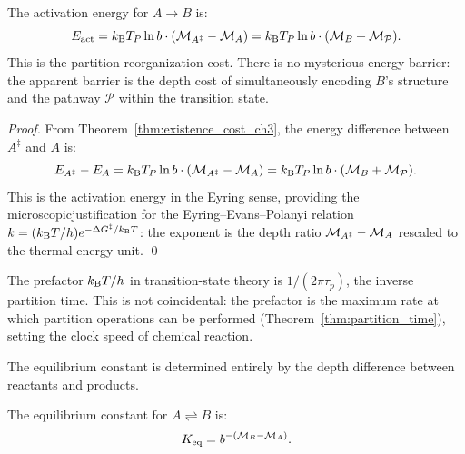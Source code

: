 \begin{corollary}
\label{cor:activation_energy}
The activation energy for $A \to B$ is:
\begin{equation}
  E_{\mathrm{act}} = k_{\mathrm{B}} T_P \ln b \cdot (\mathcal{M}_{A^\ddagger} - \mathcal{M}_A)
                   = k_{\mathrm{B}} T_P \ln b \cdot (\mathcal{M}_B + \mathcal{M}_{\mathcal{P}}).
  \label{eq:activation_energy}
\end{equation}
This is the partition reorganization cost. There is no mysterious energy
barrier: the apparent barrier is the depth cost of simultaneously encoding
$B$'s structure and the pathway $\mathcal{P}$ within the transition state.
\end{corollary}

\begin{proof}
From Theorem~\ref{thm:existence_cost_ch3}, the energy difference between
$A^\ddagger$ and $A$ is:
\begin{equation}
  E_{A^\ddagger} - E_A = k_{\mathrm{B}} T_P \ln b \cdot (\mathcal{M}_{A^\ddagger} - \mathcal{M}_A)
                       = k_{\mathrm{B}} T_P \ln b \cdot (\mathcal{M}_B + \mathcal{M}_{\mathcal{P}}).
\end{equation}
This is the activation energy in the Eyring sense, providing the microscopicjustification for the Eyring--Evans--Polanyi relation $k = ({k_{\mathrm{B}} T}/{h}) e^{-\Delta G^\ddagger/k_{\mathrm{B}} T}$:
the exponent is the depth ratio $\mathcal{M}_{A^\ddagger} - \mathcal{M}_A$ rescaled to
the thermal energy unit. \qed
\end{proof}

\begin{remark}
The prefactor $k_{\mathrm{B}} T / h$ in transition-state theory is $1/(2\pi\tau_p)$, the
inverse partition time. This is not coincidental: the prefactor is the maximum
rate at which partition operations can be performed (Theorem~\ref{thm:partition_time}),
setting the clock speed of chemical reaction.
\end{remark}

The equilibrium constant is determined entirely by the depth difference between
reactants and products.

\begin{proposition}
\label{prop:equilibrium_depth}
The equilibrium constant for $A \rightleftharpoons B$ is:
\begin{equation}
  K_{\mathrm{eq}} = b^{-(\mathcal{M}_B - \mathcal{M}_A)}.
  \label{eq:equilibrium}
\end{equation}
\end{proposition}

